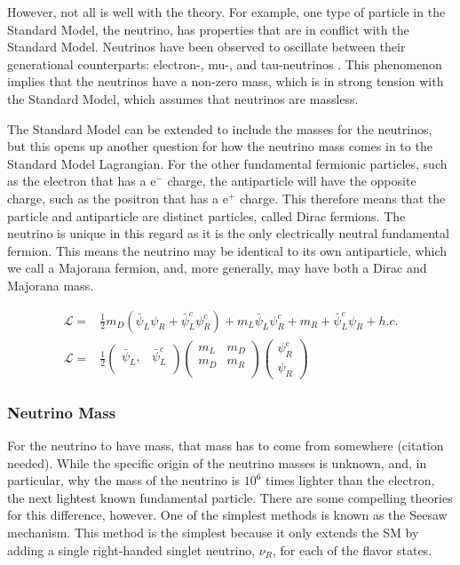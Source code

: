 \documentclass[12pt,a4paper]{article}
\begin{document}
However, not all is well with the theory. For example, one type of particle in the Standard Model, the neutrino, has properties that are in conflict with the Standard Model. Neutrinos have been observed to oscillate between their generational counterparts: electron-, mu-, and tau-neutrinos \cite{PhysRevLett.20.1205}\cite{Hatakeyama:1998ea}\cite{Ahmad:2001an}. This phenomenon implies that the neutrinos have a non-zero mass, which is in strong tension with the Standard Model, which assumes that neutrinos are massless.

The Standard Model can be extended to include the masses for the neutrinos, but this opens up another question for how the neutrino mass comes in to the Standard Model Lagrangian. For the other fundamental fermionic particles, such as the electron that has a $\textrm{e}^-$ charge, the antiparticle will have the opposite charge, such as the positron that has a $\textrm{e}^+$ charge. This therefore means that the particle and antiparticle are distinct particles, called Dirac fermions. The neutrino is unique in this regard as it is the only electrically neutral fundamental fermion. This means the neutrino may be identical to its own antiparticle, which we call a Majorana fermion, and, more generally, may have both a Dirac and Majorana mass.



\begin{align}
\mathcal{L} = & \frac{1}{2}m_D(\bar{\psi}_L\psi_R+\bar{\psi}^c_L\psi^c_R)+m_L\bar{\psi}_L\psi^c_R+m_R+\bar{\psi}^c_L\psi_R +h.c. \\
\mathcal{L} = &\frac{1}{2} \begin{pmatrix}
\bar{\psi}_L,& \bar{\psi}^c_L \\
\end{pmatrix} \begin{pmatrix}
m_L & m_D \\
m_D & m_R \\
\end{pmatrix}
\begin{pmatrix}
\psi^c_R \\
\psi_R
\end{pmatrix}
\end{align}

\subsubsection*{Neutrino Mass}

For the neutrino to have mass, that mass has to come from somewhere (\color{blue}citation needed\color{black}). While the specific origin of the neutrino masses is unknown, and, in particular, why the mass of the neutrino is $10^6$ times lighter than the electron, the next lightest known fundamental particle. There are some compelling theories for this difference, however. One of the simplest methods is known as the Seesaw mechanism. This method is the simplest because it only extends the SM by adding a single right-handed singlet neutrino, $\nu_R$, for each of the flavor states.
\end{document}
